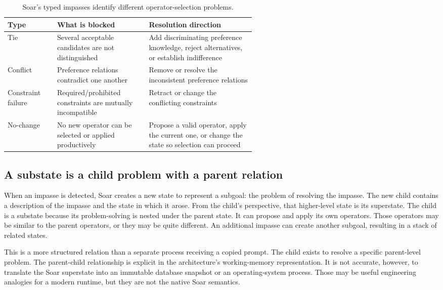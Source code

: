 \begin{table}[tbp]
\centering
\small
\caption{Soar's typed impasses identify different operator-selection problems.}
\label{tab:ch13-impasse-types}
\begin{tabularx}{\linewidth}{@{}p{0.20\linewidth}p{0.37\linewidth}X@{}}
\toprule
\textbf{Type} & \textbf{What is blocked} & \textbf{Resolution direction} \\
\midrule
Tie & Several acceptable candidates are not distinguished & Add discriminating preference knowledge, reject alternatives, or establish indifference \\
Conflict & Preference relations contradict one another & Remove or resolve the inconsistent preference relations \\
Constraint failure & Required/prohibited constraints are mutually incompatible & Retract or change the conflicting constraints \\
No-change & No new operator can be selected or applied productively & Propose a valid operator, apply the current one, or change the state so selection can proceed \\
\bottomrule
\end{tabularx}
\end{table}

\subsection{A substate is a child problem with a parent relation}
\label{subsec:ch13-substates}

When an impasse is detected, Soar creates a new state to represent a subgoal: the problem of resolving the impasse. The new child contains a description of the impasse and the state in which it arose. From the child's perspective, that higher-level state is its \gls{superstate}. The child is a \gls{substate} because its problem-solving is nested under the parent state. It can propose and apply its own operators. Those operators may be similar to the parent operators, or they may be quite different. An additional impasse can create another subgoal, resulting in a stack of related states.\autocite{soar2025architecture}

This is a more structured relation than a separate process receiving a copied prompt. The child exists to resolve a specific parent-level problem. The parent-child relationship is explicit in the architecture's working-memory representation. It is not accurate, however, to translate the Soar superstate into an immutable database snapshot or an operating-system process. Those may be useful engineering analogies for a modern runtime, but they are not the native Soar semantics.

